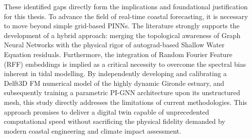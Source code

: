 These identified gaps directly form the implications and foundational justification for this thesis. To advance the field of real-time coastal forecasting, it is necessary to move beyond simple grid-based PINNs. The literature strongly supports the development of a hybrid approach: merging the topological awareness of Graph Neural Networks \cite{Pfaff2021} with the physical rigor of autograd-based Shallow Water Equation residuals. Furthermore, the integration of Random Fourier Feature (RFF) embeddings is implied as a critical necessity to overcome the spectral bias inherent in tidal modelling. By independently developing and calibrating a Delft3D FM numerical model of the highly dynamic Gironde estuary, and subsequently training a parametric PI-GNN architecture upon its unstructured mesh, this study directly addresses the limitations of current methodologies. This approach promises to deliver a digital twin capable of unprecedented computational speed without sacrificing the physical fidelity demanded by modern coastal engineering and climate impact assessment.
